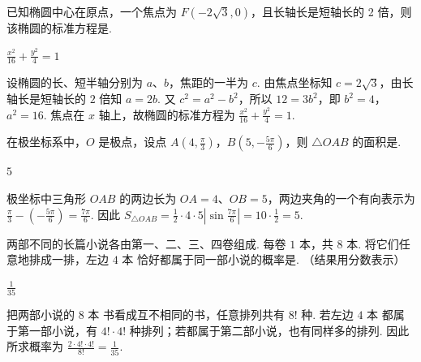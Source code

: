 \begin{problem}
已知椭圆中心在原点，一个焦点为 \(F(-2\sqrt{3}, 0)\)，且长轴长是短轴长的 2 倍，则该椭圆的标准方程是\fillinblank{}.
\end{problem}

\begin{answer}
\(\frac{x^2}{16}+\frac{y^2}{4}=1\)
\end{answer}

\begin{solution}
设椭圆的长、短半轴分别为 \(a\)、\(b\)，焦距的一半为 \(c\). 由焦点坐标知 \(c=2\sqrt{3}\)，由长轴长是短轴长的 \(2\) 倍知 \(a=2b\). 又 \(c^2=a^2-b^2\)，所以 \(12=3b^2\)，即 \(b^2=4\)，\(a^2=16\). 焦点在 \(x\) 轴上，故椭圆的标准方程为 \(\frac{x^2}{16}+\frac{y^2}{4}=1\).
\end{solution}

\begin{problem}
在极坐标系中，\(O\) 是极点，设点 \(A\left(4, \frac{\pi}{3}\right)\)，\(B\left(5, -\frac{5\pi}{6}\right)\)，则 \(\triangle OAB\) 的面积是\fillinblank{}.
\end{problem}

\begin{answer}
\(5\)
\end{answer}

\begin{solution}
极坐标中三角形 \(OAB\) 的两边长为 \(OA=4\)、\(OB=5\)，两边夹角的一个有向表示为 \(\frac{\pi}{3}-\left(-\frac{5\pi}{6}\right)=\frac{7\pi}{6}\). 因此
\(S_{\triangle OAB}=\frac{1}{2}\cdot4\cdot5\left|\sin\frac{7\pi}{6}\right|=10\cdot\frac{1}{2}=5\).
\end{solution}

\begin{problem}
两部不同的长篇小说各由第一、二、三、四卷组成. 每卷 \(1\text{ 本}\)，共 \(8\text{ 本}\). 将它们任意地排成一排，左边 \(4\text{ 本}\) 恰好都属于同一部小说的概率是\fillinblank{}. （结果用分数表示）
\end{problem}

\begin{answer}
\(\frac{1}{35}\)
\end{answer}

\begin{solution}
把两部小说的 \(8\text{ 本}\) 书看成互不相同的书，任意排列共有 \(8!\) 种. 若左边 \(4\text{ 本}\) 都属于第一部小说，有 \(4!\cdot4!\) 种排列；若都属于第二部小说，也有同样多的排列. 因此所求概率为
\(\displaystyle \frac{2\cdot4!\cdot4!}{8!}=\frac{1}{35}\).
\end{solution}

